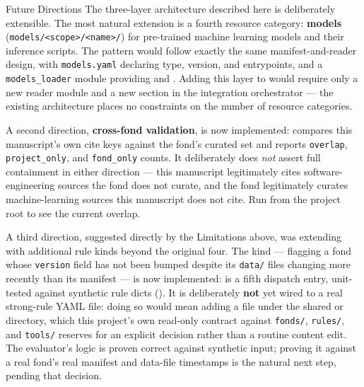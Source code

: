 \documentclass[
  ignorenonframetext,
]{beamer}
\begin{document}
\begin{frame}{Future Directions}
\protect{}\label{future-directions}
The three-layer architecture described here is deliberately extensible.
The most natural extension is a fourth resource category:
\textbf{models}
(\texttt{models/\textless{}scope\textgreater{}/\textless{}name\textgreater{}/})
for pre-trained machine learning models and their inference scripts. The
pattern would follow exactly the same manifest-and-reader design, with
\texttt{models.yaml} declaring type, version, and entrypoints, and a
\texttt{models\_loader} module providing  and
. Adding this layer to
 would require only a new reader
module and a new section in the integration orchestrator --- the
existing architecture places no constraints on the number of resource
categories.

A second direction, \textbf{cross-fond validation}, is now implemented:
 compares
this manuscript's own cite keys against the
 fond's curated set and reports
\texttt{overlap}, \texttt{project\_only}, and \texttt{fond\_only}
counts. It deliberately does \emph{not} assert full containment in
either direction --- this manuscript legitimately cites
software-engineering sources the fond does not curate, and the fond
legitimately curates machine-learning sources this manuscript does not
cite. Run
from the project root to see the current overlap.

A third direction, suggested directly by the Limitations above, was
extending  with additional rule kinds
beyond the original four. The  kind ---
flagging a fond whose \texttt{version} field has not been bumped despite
its \texttt{data/} files changing more recently than its manifest --- is
now implemented:
is a fifth dispatch entry, unit-tested against synthetic rule dicts
(). It is deliberately
\textbf{not} yet wired to a real strong-rule YAML file: doing so would
mean adding a file under the shared
 or
 directory,
which this project's own read-only contract against \texttt{fonds/},
\texttt{rules/}, and \texttt{tools/} reserves for an explicit decision
rather than a routine content edit. The evaluator's logic is proven
correct against synthetic input; proving it against a real fond's real
manifest and data-file timestamps is the natural next step, pending that
decision.


\end{frame}
\end{document}
